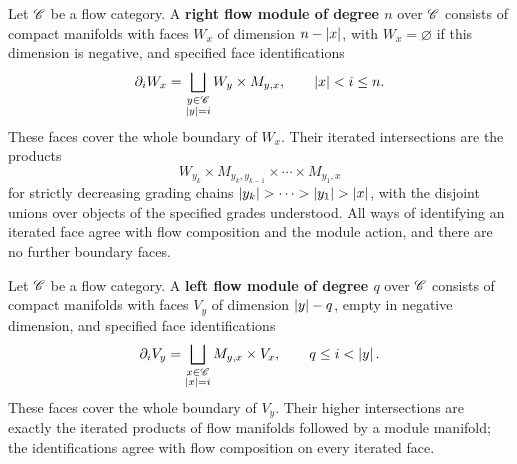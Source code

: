 \begin{defn}\label{def:RightFlowModule}
    Let $\mathscr{C}$ be a flow category. A \textbf{right flow module of degree $n$} over $\mathscr{C}$ consists of compact manifolds with faces $W_x$ of dimension $n-\left\lvert x\right\rvert$, with $W_x=\varnothing$ if this dimension is negative, and specified face identifications
    \[
        \partial_i W_x
        =\bigsqcup_{\substack{y\in\mathscr{C}\\\left\lvert y\right\rvert=i}}
          W_y\times M_{y,x},
        \qquad \left\lvert x\right\rvert<i\leq n.
    \]
    These faces cover the whole boundary of $W_x$. Their iterated intersections are the products
    \[
        W_{y_k}\times M_{y_k,y_{k-1}}\times\cdots\times M_{y_1,x}
    \]
    for strictly decreasing grading chains
    $\left\lvert y_k\right\rvert>\cdots>\left\lvert y_1\right\rvert>\left\lvert x\right\rvert$, with the disjoint unions over objects of the specified grades understood. All ways of identifying an iterated face agree with flow composition and the module action, and there are no further boundary faces.
\end{defn}

\begin{defn}\label{def:LeftFlowModule}
    Let $\mathscr{C}$ be a flow category. A \textbf{left flow module of degree $q$} over $\mathscr{C}$ consists of compact manifolds with faces $V_y$ of dimension $\left\lvert y\right\rvert-q$, empty in negative dimension, and specified face identifications
    \[
        \partial_i V_y
        =\bigsqcup_{\substack{x\in\mathscr{C}\\\left\lvert x\right\rvert=i}}
          M_{y,x}\times V_x,
        \qquad q\leq i<\left\lvert y\right\rvert.
    \]
    These faces cover the whole boundary of $V_y$. Their higher intersections are exactly the iterated products of flow manifolds followed by a module manifold; the identifications agree with flow composition on every iterated face.
\end{defn}


